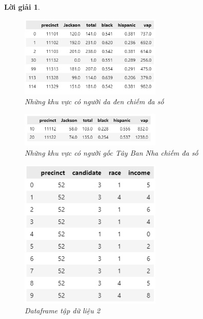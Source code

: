 \documentclass[14pt, a4paper]{article}
\theoremstyle{sltheorem}
\theoremstyle{soltheorem}
\newtheorem*{loigiai}{Lời giải}
\begin{document}
\begin{loigiai}
\begin{enumerate}
    \begin{figure}[H]
        \centering
        \includegraphics[width=0.6\textwidth]{figures/Predominant_black.png}
        \caption{Những khu vực có người da đen chiếm đa số}
        \label{fig:Predominant_black}
    \end{figure}

    \begin{figure}[H]
        \centering
        \includegraphics[width=0.6\textwidth]{figures/Predominant_hispanic.png}
        \caption{Những khu vực có người gốc Tây Ban Nha chiếm đa số}
        \label{fig:Predominant_black}
    \end{figure}

    \begin{figure}[H]
        \centering
        \includegraphics[width=0.6\textwidth]{figures/vote_df.png}
        \caption{Dataframe tập dữ liệu 2}
        \label{fig:vote_df}
    \end{figure}


\end{enumerate}
\end{loigiai}
\end{document}
